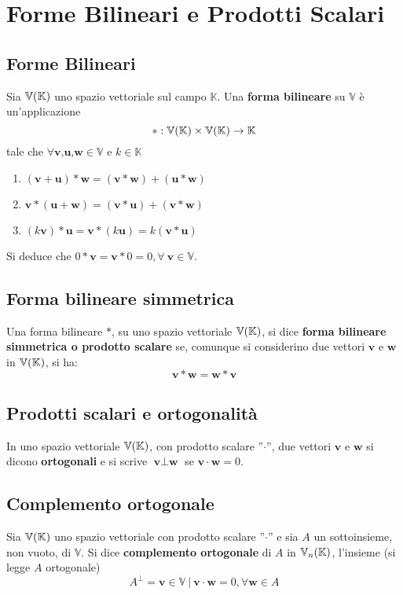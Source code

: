 \documentclass[../main.tex]{subfiles}
\begin{document}
\section{Forme Bilineari e Prodotti Scalari}


\subsection{Forme Bilineari}
Sia $\mathbb{V} (\mathbb{K})$ uno spazio vettoriale sul campo $\mathbb{K}$. Una \textbf{forma
    bilineare} su $\mathbb{V}$ è un'applicazione
\[
    *: \mathbb{V} (\mathbb{K}) \times \mathbb{V} (\mathbb{K}) \rightarrow \mathbb{K}
\]
tale che $\forall \textbf{v,u,w} \in \mathbb{V} \text{ e } k\in\mathbb{K}$
\begin{enumerate}
    \item $ (\textbf{v}+\textbf{u})* \textbf{w} = (\textbf{v}*\textbf{w})+ (\textbf{u}*\textbf{w})$
    \item $\textbf{v}*(\textbf{u}+\textbf{w}) = (\textbf{v}*\textbf{u})+ (\textbf{v}*\textbf{w})$
    \item $ (k\textbf{v})*\textbf{u}=\textbf{v}* (k\textbf{u})=k (\textbf{v}*\textbf{u})$
\end{enumerate}
Si deduce che $0*\textbf{v} = \textbf{v}*0 = 0, \forall\ \textbf{v}\in\mathbb{V}$.

\subsection{Forma bilineare simmetrica}
Una forma bilineare $*$, su uno spazio vettoriale $\mathbb{V} (\mathbb{K})$, si dice \textbf{forma
    bilineare simmetrica o prodotto scalare} se, comunque si considerino due
vettori $\textbf{v}$ e $\textbf{w}$ in $\mathbb{V} (\mathbb{K})$, si ha:
\[
    \textbf{v}*\textbf{w} = \textbf{w} * \textbf{v}\]

\subsection{Prodotti scalari e ortogonalità}
In uno spazio vettoriale $\mathbb{V} (\mathbb{K})$, con prodotto scalare ''$\cdot$'', due vettori
$\textbf{v}$ e $\textbf{w}$ si dicono \textbf{ortogonali} e si scrive
$\textbf{v}\perp\textbf{w}$ se $\textbf{v}\cdot\textbf{w} = 0$.

\subsection{Complemento ortogonale}
Sia $\mathbb{V} (\mathbb{K})$ uno spazio vettoriale con prodotto scalare ''$\cdot$'' e sia $A$ un
sottoinsieme, non vuoto, di $\mathbb{V}$. Si dice \textbf{complemento
    ortogonale} di $A$ in $\mathbb{V}_n (\mathbb{K})$, l'insieme (si legge $A$ ortogonale)
\[
    A^{\perp} = \textbf{v}\in \mathbb{V}\ |\ \textbf{v}\cdot \textbf{w} = 0,\forall\textbf{w}\in A
\]
\end{document}
